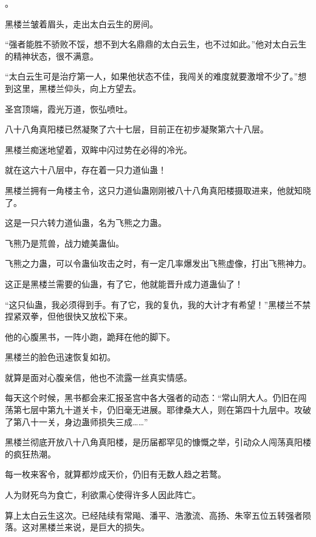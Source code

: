 
\begin{this_body}



。

黑楼兰皱着眉头，走出太白云生的房间。

“强者能胜不骄败不馁，想不到大名鼎鼎的太白云生，也不过如此。”他对太白云生的精神状态，很不满意。

“太白云生可是治疗第一人，如果他状态不佳，我闯关的难度就要激增不少了。”想到这里，黑楼兰仰头，向上方望去。

圣宫顶端，霞光万道，恢弘喷吐。

八十八角真阳楼已然凝聚了六十七层，目前正在初步凝聚第六十八层。

黑楼兰痴迷地望着，双眸中闪过势在必得的冷光。

就在这六十八层中，存在着一只力道仙蛊！

黑楼兰拥有一角楼主令，这只力道仙蛊刚刚被八十八角真阳楼摄取进来，他就知晓了。

这是一只六转力道仙蛊，名为飞熊之力蛊。

飞熊乃是荒兽，战力媲美蛊仙。

飞熊之力蛊，可以令蛊仙攻击之时，有一定几率爆发出飞熊虚像，打出飞熊神力。

这正是黑楼兰需要的仙蛊，有了它，他就能晋升成力道蛊仙了！

“这只仙蛊，我必须得到手。有了它，我的复仇，我的大计才有希望！”黑楼兰不禁捏紧双拳，但他很快又放松下来。

他的心腹黑书，一阵小跑，跪拜在他的脚下。

黑楼兰的脸色迅速恢复如初。

就算是面对心腹亲信，他也不流露一丝真实情感。

每天这个时候，黑书都会来汇报圣宫中各大强者的动态：“常山阴大人。仍旧在闯荡第七层中第九十道关卡，仍旧毫无进展。耶律桑大人，则在第四十九层中。攻破了第八十一关，身边蛊师损失三成……”

黑楼兰彻底开放八十八角真阳楼，是历届都罕见的慷慨之举，引动众人闯荡真阳楼的疯狂热潮。

每一枚来客令，就算都炒成天价，仍旧有无数人趋之若鹜。

人为财死鸟为食亡，利欲熏心使得许多人因此阵亡。

算上太白云生这次。已经陆续有常飚、潘平、浩激流、高扬、朱宰五位五转强者陨落。这对黑楼兰来说，是巨大的损失。


\end{this_body}
